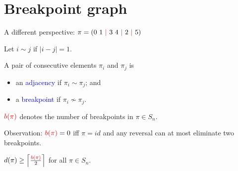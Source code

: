 \documentclass{beamer}
\theoremstyle{definition}
\newtheorem{algorithm}[theorem]{Algorithm}
\def\padding{\vspace{0.5cm}}
\def\spadding{\vspace{0.25cm}}
\def\b{\textcolor{blue}}
\def\r{\textcolor{red}}
\begin{document}




\section{Breakpoint graph}

\begin{frame}

A different perspective: $\pi = (0\ 1\ \r\mid\ 3\ 4\ \r\mid\ 2\ \r\mid\ 5)$\pause\spadding

\begin{definition}
Let $i \sim j$ if $|i - j| = 1$. \par
A pair of consecutive elements $\pi_i$ and $\pi_j$ is
\begin{itemize}
    \item an \b{adjacency} if $\pi_i \sim \pi_j$; and
    \item a \b{breakpoint} if $\pi_i \not\sim \pi_j$.
\end{itemize} \par\pause\spadding
$\r{b(\pi)}$ denotes the number of breakpoints in $\pi \in S_n$.
\end{definition}\pause\padding

Observation: $\r{b(\pi)} = 0$ iff $\pi = id$ \pause and any reversal can at most eliminate two breakpoints. \pause\spadding

\begin{corollary}
$d(\pi) \geq \left\lceil \frac{\r{b(\pi)}}{2} \right\rceil$ for all $\pi \in S_n$.
\end{corollary}

\end{frame}
\end{document}
